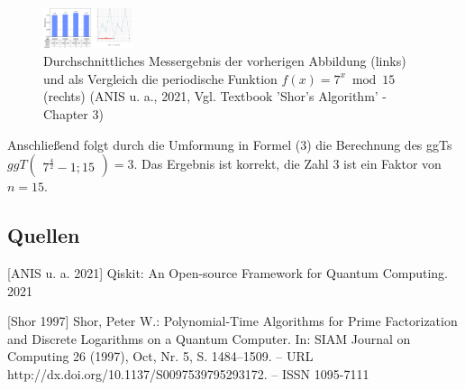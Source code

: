         \begin{figure}
            \centering
            \includegraphics[width=100]{content/shor_beispiel_messung.png}
            \caption{Durchschnittliches Messergebnis der vorherigen Abbildung (links) und als Vergleich die periodische Funktion \(f(x) = 7^{x}\bmod{15}\) (rechts) (ANIS u. a., 2021, Vgl. Textbook ’Shor’s Algorithm’ - Chapter 3)}
            \label{fig:shorExampleMessung}
        \end{figure}
        
        Anschließend folgt durch die Umformung in Formel (3) die Berechnung des ggTs \(ggT\begin{pmatrix}7^\frac{4}{2}-1; 15\end{pmatrix} = 3\). Das Ergebnis ist korrekt, die Zahl \(3\) ist ein Faktor von \(n=15\).

	\newline \newline 
\newline
{}



\newline \newline
\subsection{Quellen}

[ANIS u. a. 2021] Qiskit: An Open-source Framework for Quantum Computing. 2021 \newline

[Shor 1997] Shor, Peter W.: Polynomial-Time Algorithms for Prime Factorization and Discrete Logarithms on a Quantum Computer. In: SIAM Journal on Computing 26 (1997), Oct, Nr. 5, S. 1484–1509. – URL http://dx.doi.org/10.1137/S0097539795293172. – ISSN 1095-7111